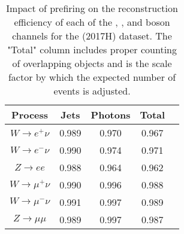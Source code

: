 \begin{table}[htbp]
\begin{center}
\begin{tabular}{|c|c|c|c|c|}
\hline
Process & Jets & Photons & Total \\\hline \hline
$W\rightarrow e^+\nu$      & 0.989 & 0.970 & 0.967 \\
$W\rightarrow e^-\nu$      & 0.990 & 0.974 & 0.971\\
$Z\rightarrow ee$          & 0.988 & 0.964 & 0.962 \\
\hline
$W\rightarrow \mu^+\nu$   & 0.990 & 0.996 & 0.988 \\
$W\rightarrow \mu^-\nu$   & 0.991 & 0.997 & 0.989 \\
$Z\rightarrow \mu\mu$     & 0.989 & 0.997 & 0.987 \\
\hline
\end{tabular}
\end{center}

\caption{Impact of prefiring on the reconstruction efficiency of each of the \Wp, \Wm, and \Z boson channels for the \sh (2017H) dataset. The "Total" column includes proper counting of overlapping objects and is the scale factor by which the expected number of events is adjusted.}
\label{tab:prefire:13}
\end{table}
